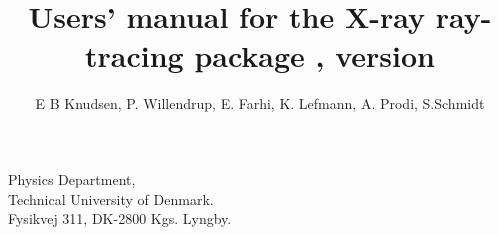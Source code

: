 \title{Users' manual for the X-ray ray-tracing package \MCX, version \version}

\author{E B Knudsen, P. Willendrup, E. Farhi, K. Lefmann, A. Prodi, S.Schmidt}

\date{\releasedate}

Physics Department,\\
Technical University of Denmark.\\

Fysikvej 311, DK-2800 Kgs. Lyngby.

